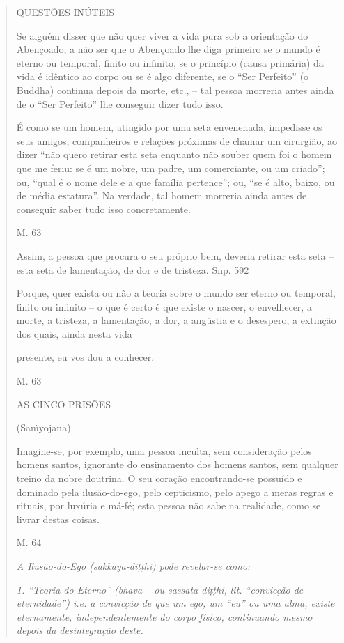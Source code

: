 \begin{quote}
QUESTÕES INÚTEIS

Se alguém disser que não quer viver a vida pura sob a orientação do Abençoado, a não ser que o Abençoado lhe diga primeiro se o mundo é eterno ou temporal, finito ou infinito, se o princípio (causa primária) da vida é idêntico ao corpo ou se é algo diferente, se o ``Ser Perfeito'' (o Buddha) continua depois da morte, etc., -- tal pessoa morreria antes ainda de o ``Ser Perfeito'' lhe conseguir dizer tudo isso.

É como se um homem, atingido por uma seta envenenada, impedisse os seus amigos, companheiros e relações próximas de chamar um cirurgião, ao dizer ``não quero retirar esta seta enquanto não souber quem foi o homem que me feriu: se é um nobre, um padre, um comerciante, ou um criado''; ou, ``qual é o nome dele e a que família pertence''; ou, ``se é alto, baixo, ou de média estatura''. Na verdade, tal homem morreria ainda antes de conseguir saber tudo isso concretamente.

M. 63

Assim, a pessoa que procura o seu próprio bem, deveria retirar esta seta -- esta seta de lamentação, de dor e de tristeza. Snp. 592

Porque, quer exista ou não a teoria sobre o mundo ser eterno ou temporal, finito ou infinito -- o que é certo é que existe o nascer, o envelhecer, a morte, a tristeza, a lamentação, a dor, a angústia e o desespero, a extinção dos quais, ainda nesta vida

presente, eu vos dou a conhecer.

M. 63

AS CINCO PRISÕES

(Saṁyojana)

Imagine-se, por exemplo, uma pessoa inculta, sem consideração pelos homens santos, ignorante do ensinamento dos homens santos, sem qualquer treino da nobre doutrina. O seu coração encontrando-se possuído e dominado pela ilusão-do-ego, pelo cepticismo, pelo apego a meras regras e rituais, por luxúria e má-fé; esta pessoa não sabe na realidade, como se livrar destas coisas.

M. 64

\emph{A Ilusão-do-Ego (sakkāya-diṭṭhi) pode revelar-se como:}

\emph{1. ``Teoria do Eterno'' (bhava -- ou sassata-diṭṭhi, lit. ``convicção de eternidade'') i.e. a convicção de que um ego, um ``eu'' ou uma alma, existe eternamente, independentemente do corpo físico, continuando mesmo depois da desintegração deste.}


\end{quote}
